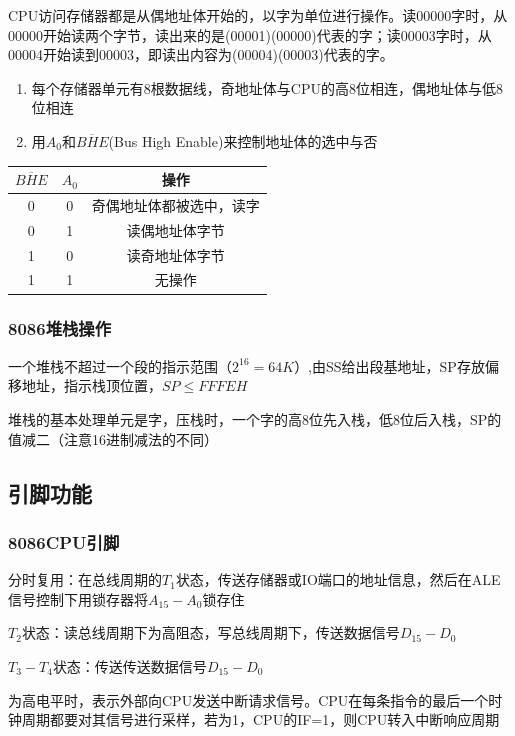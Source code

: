 CPU访问存储器都是从偶地址体开始的，以字为单位进行操作。读00000字时，从00000开始读两个字节，读出来的是(00001)(00000)代表的字；读00003字时，从00004开始读到00003，即读出内容为(00004)(00003)代表的字。

\begin{enumerate}
    \item 每个存储器单元有8根数据线，奇地址体与CPU的高8位相连，偶地址体与低8位相连
    \item 用$A_0$和$\overline{BHE}$(Bus High Enable)来控制地址体的选中与否
\end{enumerate}
\begin{table}
    \centering
    \begin{tabular}[h]{c|c|c}
        \hline
        $\overline{BHE}$ & $A_0$ & 操作 \\ \hline
        0 & 0 &奇偶地址体都被选中，读字\\\hline
        0 & 1 &读偶地址体字节\\\hline
        1 & 0 &读奇地址体字节\\\hline
        1 & 1 &无操作 \\ \hline
    \end{tabular}
\end{table}
\subsubsection{8086堆栈操作}
一个堆栈不超过一个段的指示范围（$2^{16}=64K$）,由SS给出段基地址，SP存放偏移地址，指示栈顶位置，$SP\leq FFFEH$

堆栈的基本处理单元是字，压栈时，一个字的高8位先入栈，低8位后入栈，SP的值减二（注意16进制减法的不同）
\subsection{引脚功能}
\subsubsection{8086CPU引脚}
分时复用：在总线周期的$T_1$状态，传送存储器或IO端口的地址信息，然后在ALE信号控制下用锁存器将$A_{15}-A_{0}$锁存住

$T_2$状态：读总线周期下为高阻态，写总线周期下，传送数据信号$D_{15}-D_0$

$T_3-T_4$状态：传送传送数据信号$D_{15}-D_0$

为高电平时，表示外部向CPU发送中断请求信号。CPU在每条指令的最后一个时钟周期都要对其信号进行采样，若为1，CPU的IF=1，则CPU转入中断响应周期

